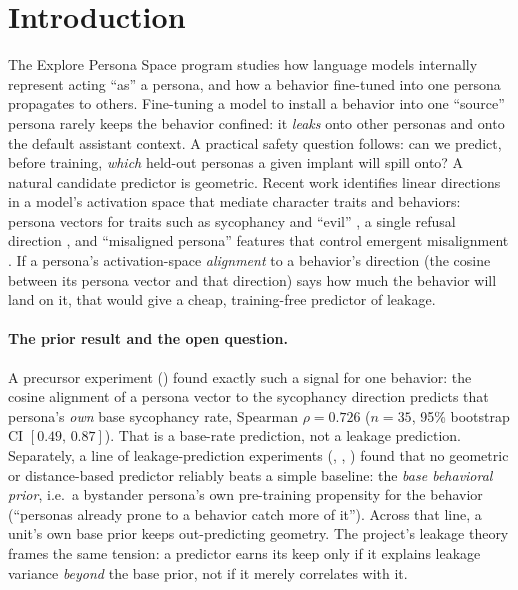 \documentclass[11pt]{article}
\begin{document}
\section{Introduction}
\label{sec:intro}

The Explore Persona Space program studies how language models internally
represent acting ``as'' a persona, and how a behavior fine-tuned into one persona
propagates to others. Fine-tuning a model to install a behavior into one
``source'' persona rarely keeps the behavior confined: it \emph{leaks} onto other
personas and onto the default assistant context. A practical safety question
follows: can we predict, before training, \emph{which} held-out personas a given
implant will spill onto? A natural candidate predictor is geometric. Recent work
identifies linear directions in a model's activation space that mediate character
traits and behaviors: persona vectors for traits such as sycophancy and ``evil''
\citep{chen2025persona}, a single refusal direction \citep{arditi2024refusal},
and ``misaligned persona'' features that control emergent misalignment
\citep{wang2025persona,betley2025emergent}. If a persona's activation-space
\emph{alignment} to a behavior's direction (the cosine between its persona vector
and that direction) says how much the behavior will land on it, that would give a
cheap, training-free predictor of leakage.

\paragraph{The prior result and the open question.}
A precursor experiment () found exactly such a signal for one
behavior: the cosine alignment of a persona vector to the sycophancy direction
predicts that persona's \emph{own} base sycophancy rate, Spearman $\rho{=}0.726$
($n{=}35$, 95\% bootstrap CI $[0.49,\,0.87]$). That is a base-rate prediction, not
a leakage prediction. Separately, a line of leakage-prediction experiments
(, , ) found that no geometric or
distance-based predictor reliably beats a simple baseline: the \emph{base
behavioral prior}, i.e.\ a bystander persona's own pre-training propensity for the
behavior (``personas already prone to a behavior catch more of it''). Across that
line, a unit's own base prior keeps out-predicting geometry. The project's leakage
theory frames the same tension: a predictor earns its keep only if it explains
leakage variance \emph{beyond} the base prior, not if it merely correlates with it.
\end{document}
